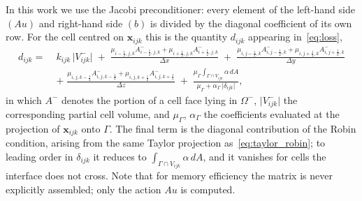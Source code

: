 %

In this work we use the Jacobi preconditioner: every element of the left-hand side
$(A u)$ and right-hand side $(b)$ is divided by the diagonal coefficient of its own
row. For the cell centred on $\mathbf{x}_{ijk}$ this is the quantity $d_{ijk}$
appearing in~\eqref{eq:loss},
\begin{equation}
\begin{aligned}
  d_{ijk} = \; & k_{ijk}\,\bigl|V^{-}_{ijk}\bigr|
  \;+\; \frac{\mu_{i-\frac12,j,k} A^{-}_{i-\frac12,j,k}
            + \mu_{i+\frac12,j,k} A^{-}_{i+\frac12,j,k}}{\Delta x}
  \;+\; \frac{\mu_{i,j-\frac12,k} A^{-}_{i,j-\frac12,k}
            + \mu_{i,j+\frac12,k} A^{-}_{i,j+\frac12,k}}{\Delta y} \\[4pt]
  & +\; \frac{\mu_{i,j,k-\frac12} A^{-}_{i,j,k-\frac12}
            + \mu_{i,j,k+\frac12} A^{-}_{i,j,k+\frac12}}{\Delta z}
  \;+\; \frac{\mu_{\Gamma}\displaystyle\int_{\Gamma \cap V_{ijk}} \alpha \, dA}
             {\mu_{\Gamma} + \alpha_{\Gamma}\,\bigl|\delta_{ijk}\bigr|} ,
\end{aligned}
\label{eq:diagonal}
\end{equation}
in which $A^{-}$ denotes the portion of a cell face lying in $\Omega^{-}$,
$\bigl|V^{-}_{ijk}\bigr|$ the corresponding partial cell volume, and $\mu_{\Gamma}$,
$\alpha_{\Gamma}$ the coefficients evaluated at the projection of $\mathbf{x}_{ijk}$
onto $\Gamma$. The final term is the diagonal contribution of the Robin condition,
arising from the same Taylor projection as~\eqref{eq:taylor_robin}; to leading order in
$\delta_{ijk}$ it reduces to $\int_{\Gamma \cap V_{ijk}} \alpha \, dA$, and it vanishes
for cells the interface does not cross. Note that for memory efficiency the matrix is
never explicitly assembled; only the action $A u$ is computed.
